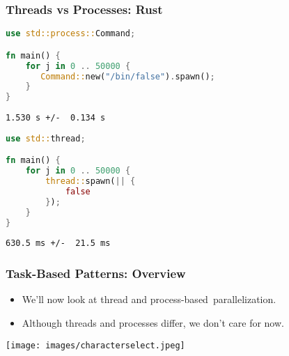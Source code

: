 \begin{frame}[fragile]
\frametitle{Threads vs Processes: Rust}

\begin{multicols}{2}

\begin{lstlisting}[language=Rust]
use std::process::Command;

fn main() {
    for j in 0 .. 50000 {
       Command::new("/bin/false").spawn();
    }
}
\end{lstlisting}
\begin{verbatim}
1.530 s +/-  0.134 s
\end{verbatim}
\columnbreak
\begin{lstlisting}[language=Rust]
use std::thread;

fn main() {
    for j in 0 .. 50000 {
        thread::spawn(|| {
            false
        });
    }
}
\end{lstlisting}
\begin{verbatim}
630.5 ms +/-  21.5 ms 
\end{verbatim}

\end{multicols}

  
\end{frame}

\begin{frame}
  \frametitle{Task-Based Patterns: Overview}

  
  \begin{itemize}
    \item We'll now look at thread and process-based~parallelization.
    \item Although threads and processes differ, we don't care for now.
  \end{itemize}
  
  \begin{center}
	\texttt{[image: images/characterselect.jpeg]}
  \end{center}

\end{frame}

